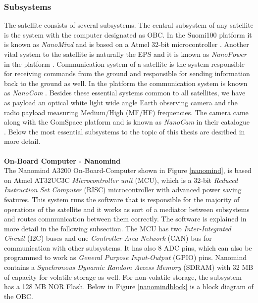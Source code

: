 \documentclass[english,12pt,a4paper,pdftex,elec,utf8]{aaltothesis}
\begin{document}
\subsubsection{Subsystems}
The satellite consists of several subsystems. The central subsystem of any satellite is the system with the computer designated as OBC. In the Suomi100 platform it is known as \textit{NanoMind} and is based on a Atmel 32-bit microcontroller \cite{nanomindds}. Another vital system to the satellite is naturally the EPS and it is known as \textit{NanoPower} in the platform \cite{nanopowerds}. Communication system of a satellite is the system responsible for receiving commands from the ground and responsible for sending information back to the ground as well. In the platform the communication system is known as \textit{NanoCom} \cite{nanocomds}. Besides these essential systems common to all satellites, we have as payload an optical white light wide angle Earth observing camera and the radio payload measuring Medium/High (MF/HF) frequencies. The camera came along with the GomSpace platform and is known as \textit{NanoCam} in their catalogue \cite{nanocamds}. Below the most essential subsystems to the topic of this thesis are desribed in more detail. 
\\
\\
\textbf{On-Board Computer - Nanomind}\\
The Nanomind A3200 On-Board-Computer shown in Figure \ref{nanomind}, is based on Atmel AT32UC3C \textit{Microcontroller unit} (MCU), which is a 32-bit \textit{Reduced Instruction Set Computer} (RISC) microcontroller with advanced power saving features. This system runs the software that is responsible for the majority of operations of the satellite and it works as sort of a mediator between subsystems and routes communication between them correctly. The software is explained in more detail in the following subsection. The MCU has two \textit{Inter-Integrated Circuit} (I2C) buses and one \textit{Controller Area Network} (CAN) bus for communication with other subsystems. It has also 8 ADC pins, which can also be programmed to work as \textit{General Purpose Input-Output} (GPIO) pins. Nanomind contains a \textit{Synchronous Dynamic Random Access Memory} (SDRAM) with 32 MB of capacity for volatile storage as well. For non-volatile storage, the subsystem has a 128 MB NOR Flash. Below in Figure \ref{nanomindblock} is a block diagram of the OBC. \cite{nanomindds}\\
\\
\end{document}
